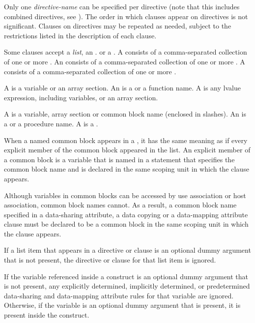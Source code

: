 Only one \emph{directive-name} can be specified per directive (note that this 
includes combined directives, see ). The order 
in which clauses appear on directives is not significant. Clauses on directives 
may be repeated as needed, subject to the restrictions listed in the description 
of each clause.

Some clauses accept a \emph{list}, an . or a .  
A  consists of a comma-separated collection of one or more . 
An  consists of a comma-separated collection of one or more
. A  consists of a comma-separated
collection of one or more .

\begin{ccppspecific}
A  is a variable or an array section. An  is
a  or a function name.  A  is any lvalue
expression, including variables, or an array section.
\end{ccppspecific}

\begin{fortranspecific}
A  is a variable, array section or common block name
(enclosed in slashes). An  is a 
or a procedure name. A  is a .

When a named common block appears in a , it has the same
meaning as if every explicit member of the common block appeared in
the list.  An explicit member of a common block is a variable that is
named in a  statement that specifies the common block
name and is declared in the same scoping unit in which the clause
appears.

Although variables in common blocks can be accessed by use association
or host association, common block names cannot.  As a result, a common
block name specified in a data-sharing attribute, a data copying or
a data-mapping attribute clause must be declared to be a common block in
the same scoping unit in which the clause appears.

If a list item that appears in a directive or clause is an optional
dummy argument that is not present, the directive or clause for that
list item is ignored.

If the variable referenced inside a construct is an optional dummy
argument that is not present, any explicitly determined, implicitly
determined, or predetermined data-sharing and data-mapping attribute
rules for that variable are ignored.  Otherwise, if the variable is an
optional dummy argument that is present, it is present inside the
construct.
\end{fortranspecific}

